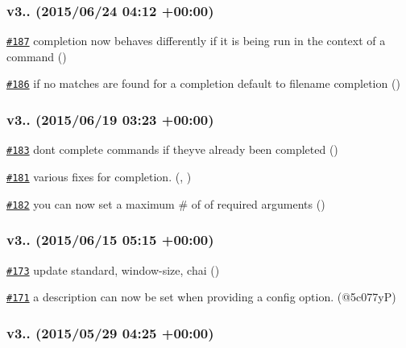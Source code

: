 \subsubsection*{v3.. (2015/06/24 04\+:12 +00\+:00)}


\begin{DoxyItemize}
\item \href{https://github.com/bcoe/yargs/pull/187}{\tt \#187} completion now behaves differently if it is being run in the context of a command ()
\item \href{https://github.com/bcoe/yargs/pull/186}{\tt \#186} if no matches are found for a completion default to filename completion ()
\end{DoxyItemize}

\subsubsection*{v3.. (2015/06/19 03\+:23 +00\+:00)}


\begin{DoxyItemize}
\item \href{https://github.com/bcoe/yargs/pull/183}{\tt \#183} don\textquotesingle{}t complete commands if they\textquotesingle{}ve already been completed ()
\item \href{https://github.com/bcoe/yargs/pull/181}{\tt \#181} various fixes for completion. (, )
\item \href{https://github.com/bcoe/yargs/pull/182}{\tt \#182} you can now set a maximum \# of of required arguments ()
\end{DoxyItemize}

\subsubsection*{v3.. (2015/06/15 05\+:15 +00\+:00)}


\begin{DoxyItemize}
\item \href{https://github.com/bcoe/yargs/pull/173}{\tt \#173} update standard, window-\/size, chai ()
\item \href{https://github.com/bcoe/yargs/pull/171}{\tt \#171} a description can now be set when providing a config option. (@5c077yP)
\end{DoxyItemize}

\subsubsection*{v3.. (2015/05/29 04\+:25 +00\+:00)}


